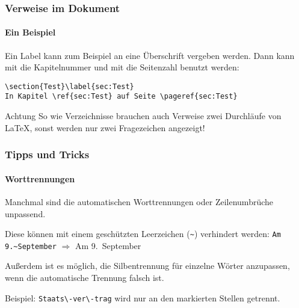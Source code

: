 \begin{frame}[fragile]
    \frametitle{Verweise im Dokument}
    \framesubtitle{Ein Beispiel}
    Ein Label kann zum Beispiel an eine Überschrift vergeben werden. Dann kann mit  die Kapitelnummer und mit  die Seitenzahl benutzt werden:
    \bigskip
    \pause

    \begin{verbatim}
\section{Test}\label{sec:Test}
In Kapitel \ref{sec:Test} auf Seite \pageref{sec:Test}
    \end{verbatim}
    
    \pause
    \begin{alertblock}{Achtung}
        So wie Verzeichnisse brauchen auch Verweise zwei Durchläufe von \LaTeX{}, sonst werden nur zwei Fragezeichen angezeigt!
    \end{alertblock}
\end{frame}


\begin{frame}[fragile]
    \frametitle{Tipps und Tricks}
    \framesubtitle{Worttrennungen}
    Manchmal sind die automatischen Worttrennungen oder Zeilenumbrüche unpassend.
    \medskip    
    
    Diese können mit einem geschützten Leerzeichen (\texttt{\~{}}) verhindert werden: \verb+Am 9.~September+ $\Rightarrow$ Am 9.~September
    
    \medskip
    Außerdem ist es möglich, die Silbentrennung für einzelne Wörter anzupassen, wenn die automatische Trennung falsch ist.
    
    Beispiel: \verb+Staats\-ver\-trag+ wird nur an den markierten Stellen getrennt.
\end{frame}